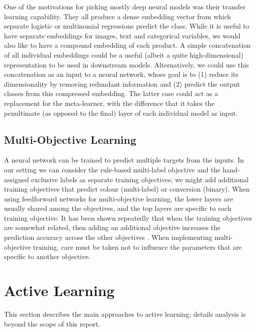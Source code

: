 One of the motivations for picking mostly deep neural models was their transfer learning capability.
They all produce a dense embedding vector from which separate logistic or multinomial regressions predict the class.
While it is useful to have separate embeddings for images, text and categorical variables, we would also like to have a compound embedding of each product.
A simple concatenation of all individual embeddings could be a useful (albeit a quite high-dimensional) representation to be used in downstream models.
Alternatively, we could use this concatenation as an input to a neural network, whose goal is to (1) reduce its dimensionality by removing redundant information and (2) predict the output classes from this compressed embedding.
The latter case could act as a replacement for the meta-learner, with the difference that it takes the penultimate (as opposed to the final) layer of each individual model as input.


\subsection{Multi-Objective Learning}
\label{multiobj}

A neural network can be trained to predict multiple targets from the inputs.
In our setting we can consider the rule-based multi-label objective and the hand-assigned exclusive labels as separate training objectives; we might add additional training objectives that predict colour (multi-label) or conversion (binary).
When using feedforward networks for multi-objective learning, the lower layers are usually shared among the objectives, and the top layers are specific to each training objective.
It has been shown repeatedly that when the training objectives are somewhat related, then adding an additional objective increases the prediction accuracy across the other objectives \cite{}.
When implementing multi-objective training, care must be taken not to influence the parameters that are specific to another objective.



\section{Active Learning}
\label{bg_al}

This section describes the main approaches to active learning;  details analysis is beyond the scope of this report.


